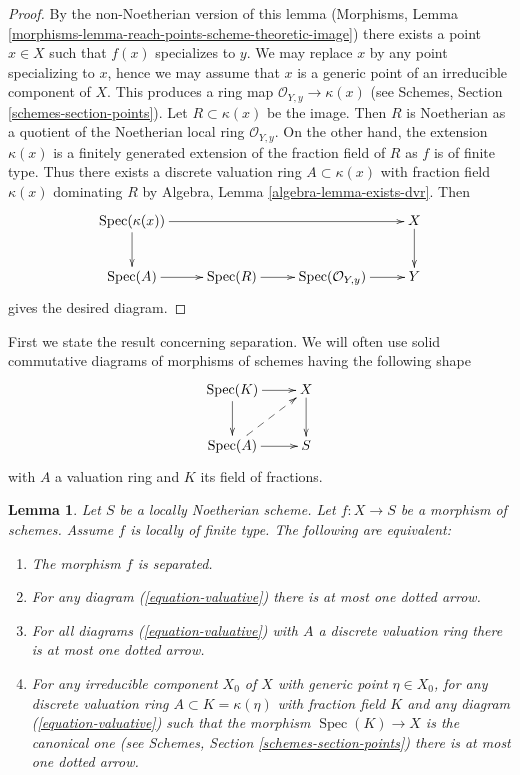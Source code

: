 \documentclass{stacks-project}
\theoremstyle{plain}
\newtheorem{lemma}[subsection]{Lemma}
\theoremstyle{definition}
\theoremstyle{remark}
\numberwithin{equation}{subsection}
\def\Spec{\mathop{\mathrm{Spec}}}
\begin{document}
\begin{proof}
By the non-Noetherian version of this lemma
(Morphisms, Lemma \ref{morphisms-lemma-reach-points-scheme-theoretic-image})
there exists a point $x \in X$ such that $f(x)$ specializes to $y$.
We may replace $x$ by any point specializing to $x$, hence we may
assume that $x$ is a generic point of an irreducible component of $X$.
This produces a ring map $\mathcal{O}_{Y, y} \to \kappa(x)$
(see Schemes, Section \ref{schemes-section-points}).
Let $R \subset \kappa(x)$ be the image. Then $R$ is Noetherian as a quotient
of the Noetherian local ring $\mathcal{O}_{Y, y}$.
On the other hand, the extension $\kappa(x)$ is
a finitely generated extension of the fraction field of $R$
as $f$ is of finite type.
Thus there exists a discrete valuation ring $A \subset \kappa(x)$
with fraction field $\kappa(x)$ dominating $R$ by
Algebra, Lemma \ref{algebra-lemma-exists-dvr}. Then
$$
\xymatrix{
\Spec(\kappa(x)) \ar[d] \ar[rrr] & & & X \ar[d] \\
\Spec(A) \ar[r] & \Spec(R) \ar[r] & \Spec(\mathcal{O}_{Y, y}) \ar[r] & Y
}
$$
gives the desired diagram.
\end{proof}

\noindent
First we state the result concerning
separation. We will often use solid commutative diagrams of morphisms of
schemes having the following shape
\begin{equation}
\label{equation-valuative}
\vcenter{
\xymatrix{
\Spec(K) \ar[r] \ar[d] & X \ar[d] \\
\Spec(A) \ar[r] \ar@{-->}[ru] & S
}
}
\end{equation}
with $A$ a valuation ring and $K$ its field of fractions.

\begin{lemma}
\label{lemma-Noetherian-dvr-valuative-separation}
Let $S$ be a locally Noetherian scheme.
Let $f : X \to S$ be a morphism of schemes.
Assume $f$ is locally of finite type.
The following are equivalent:
\begin{enumerate}
\item The morphism $f$ is separated.
\item For any diagram (\ref{equation-valuative}) there is at most
one dotted arrow.
\item For all diagrams (\ref{equation-valuative}) with $A$ a discrete
valuation ring there is at most one dotted arrow.
\item For any irreducible component $X_0$ of $X$ with
generic point $\eta \in X_0$, for any discrete valuation ring
$A \subset K = \kappa(\eta)$ with fraction field $K$ and any
diagram (\ref{equation-valuative}) such that
the morphism $\Spec(K) \to X$ is the canonical one
(see Schemes, Section \ref{schemes-section-points})
there is at most one dotted arrow.
\end{enumerate}
\end{lemma}
\end{document}
